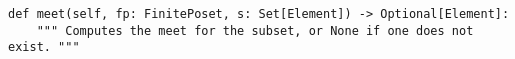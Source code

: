 \begin{verbatim}
def meet(self, fp: FinitePoset, s: Set[Element]) -> Optional[Element]:
    """ Computes the meet for the subset, or None if one does not exist. """
\end{verbatim}